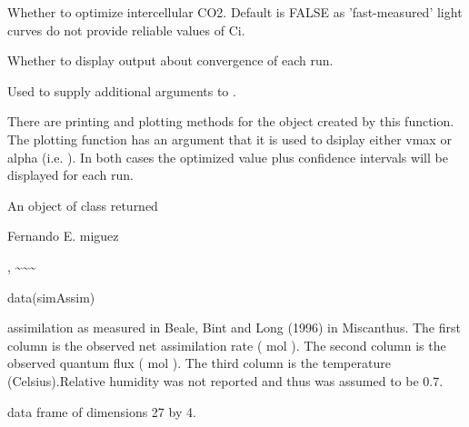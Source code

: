 \documentclass[letterpaper]{book}
\begin{document}
\begin{Arguments}
\begin{ldescription}
\item[\code{op.ci}] Whether to optimize intercellular CO2.
Default is FALSE as 'fast-measured' light curves do not
provide reliable values of Ci.

\item[\code{verbose}] Whether to display output about
convergence of each run.

\item[\code{...}] Used to supply additional arguments to
.
\end{ldescription}
\end{Arguments}
%
\begin{Details}\relax
There are printing and plotting methods for the object
created by this function. The plotting function has an
argument that it is used to dsiplay either vmax or alpha
(i.e. ). In both cases the
optimized value plus confidence intervals will be displayed
for each run.
\end{Details}
%
\begin{Value}
An object of class  
returned 


\end{Value}
%
\begin{Author}\relax
Fernando E. miguez
\end{Author}
%
\begin{SeeAlso}\relax
{} 
, \textasciitilde{}\textasciitilde{}\textasciitilde{}
\end{SeeAlso}
%
\begin{Examples}
\begin{ExampleCode}
data(simAssim)
\end{ExampleCode}
\end{Examples}
%
\begin{Description}\relax
assimilation as measured in Beale, Bint and Long (1996) in
Miscanthus.  The first column is the observed net
assimilation rate (\eqn{\mu}{} mol 
).  The second column is the observed quantum
flux (\eqn{\mu}{} mol  ). The third
column is the temperature (Celsius).Relative humidity was
not reported and thus was assumed to be 0.7.
\end{Description}
%
\begin{Format}
data frame of dimensions 27 by 4.
\end{Format}
\end{document}

